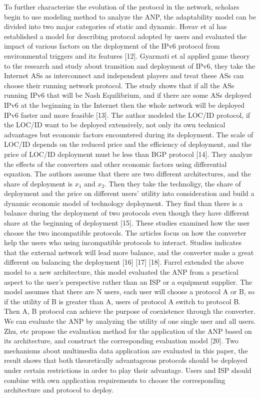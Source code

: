 \documentclass{article}
\begin{document}
To further characterize the evolution of the protocol in the network, scholars begin to use modeling method to
analyze the ANP, the adaptability model can be divided into two major categories of static and dynamic.
Hovav et al has established a model for describing protocol adopted by users and evaluated the impact of
various factors on the deployment of the IPv6 protocol from environmental triggers and its features [12].
Gyarmati et al applied game theory to the research and study about transition and deployment of IPv6,
they take the Internet ASs as interconnect and independent players and treat these ASs can choose their
running network protocol. The study shows that if all the ASs running IPv6 that will be Nash Equilibrium,
and if there are some ASs deployed IPv6 at the beginning in the Internet then the whole network will be
deployed IPv6 faster and more feasible [13]. The author modeled the LOC/ID protocol, if the LOC/ID want
to be deployed extensively, not only its own technical advantages but economic factors encountered during
its deployment. The scale of LOC/ID depends on the reduced price and the efficiency of deployment, and the
price of LOC/ID deployment must be less than BGP protocol [14]. They analyze the effects of the converters
and other economic factors using differential equation. The authors assume that there are two different
architectures, and the share of deployment is
\(x_{1}\) and \(x_{2}\).
Then they take the technoligy, the share of deployment and the price on different users'
utility into consideration and build a dynamic economic model of technology deployment. They find than there is a
balance during the deployment of two protocols even though they have different share at the beginning of
deployment [15]. These studies examined how the user choose the two incompatible protocols. The articles focus
on how the converter help the users who using incompatible protocols to interact. Studies indicates that the external
network will lead more balance, and the converter make a great different on balancing the deployment [16] [17] [18].
Farrel extended the above model to a new architecture, this model evaluated the ANP from a practical aspect to the
user's perspective rather than an ISP or a equipment supplier. The model assumes that there are N users, each user
will choose a protocol A or B, so if the utility of B is greater than A, users of protocol A switch to protocol B.
Then A, B protocol can achieve the purpose of coexistence through the converter. We can evaluate the ANP by analyzing
the utility of one single user and all users. Zhu, etc propose the evaluation method for the application of the
ANP based on its architecture, and construct the corresponding evaluation model [20]. Two mechanisms about multimedia
data application are evaluated in this paper, the result shows that both theoretically advantageous protocols should
be deployed under certain restrictions in order to play their advantage. Users and ISP should combine with own
application requirements to choose the corresponding architecture and protocol to deploy.
\end{document}

